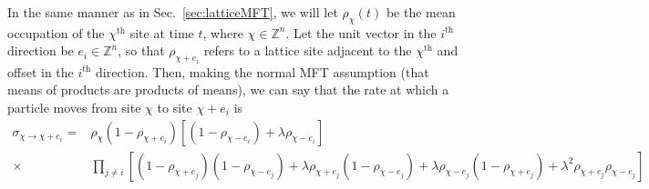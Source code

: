 In the same manner as in Sec.~\ref{sec:latticeMFT}, we will let $\rho_\chi (t)$ be the mean occupation of the $\chi^\mathrm{th}$ site
at time $t$, where $\chi \in \mathbb{Z}^n$. Let the unit vector in the $i^\mathrm{th}$
direction be $e_i \in \mathbb{Z}^n$, so that $\rho_{\chi+e_i}$ refers to a lattice site adjacent to the $\chi^\mathrm{th}$ and offset in the $i^\mathrm{th}$ direction. Then,
making the normal MFT assumption (that means of products are products of means),
we can say that the rate at which a particle moves from site $\chi$ to site $\chi+e_i$ is
\begin{align}
 \sigma_{\chi \rightarrow \chi + e_i} = &\rho_\chi (1 - \rho_{\chi+e_i}) \left[ \left( 1- \rho_{\chi-e_i} \right) + \lambda \rho_{\chi-e_i} \right] \\
 \times &\prod_{j \ne i} \left[  (1-\rho_{\chi+e_j})(1-\rho_{\chi-e_j}) + \lambda\rho_{\chi+e_j}(1-\rho_{\chi-e_j}) + \lambda \rho_{\chi-e_j}(1-\rho_{\chi+e_j}) + \lambda^2 \rho_{\chi+e_j}\rho_{\chi-e_j}
   \right]
\end{align}

